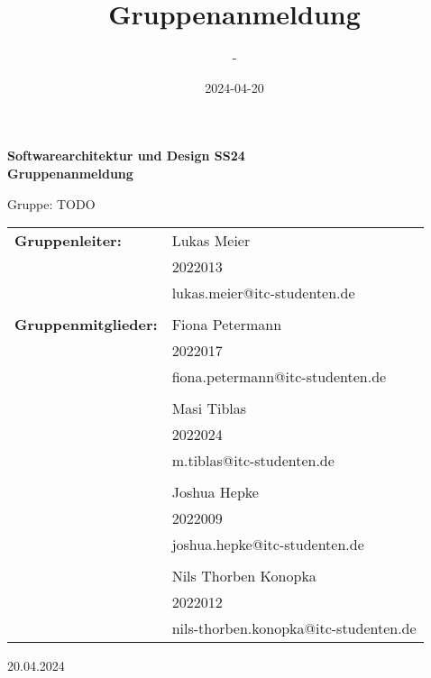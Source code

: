 \documentclass[11pt,a4paper]{article}
\title{Gruppenanmeldung}
\date{2024-04-20}
\author{-}
\begin{document}
	\begin{titlepage}
		\begin{center}			
			\Huge
			\textbf{Softwarearchitektur und Design SS24\\ Gruppenanmeldung}
			
			\vspace{0.5cm}
			\LARGE
			Gruppe: TODO
			
			\vspace{1.5cm}
			
			\vfill
			
			\large
			\begin{tabular}{p{8cm}l}
				\textbf{Gruppenleiter:} & Lukas Meier\\
				& 2022013\\
				& lukas.meier@itc-studenten.de\\ 
				&\\
				\textbf{Gruppenmitglieder:} & Fiona Petermann\\
				& 2022017\\
				& fiona.petermann@itc-studenten.de\\
				&\\
				& Masi Tiblas\\
				& 2022024\\
				& m.tiblas@itc-studenten.de\\
				&\\
				& Joshua Hepke\\
				& 2022009\\
				& joshua.hepke@itc-studenten.de\\
				&\\
				& Nils Thorben Konopka\\
				& 2022012\\
				& nils-thorben.konopka@itc-studenten.de
			\end{tabular}
			\Large
			\vfill
			20.04.2024
			
		\end{center}
	\end{titlepage}
\end{document}
